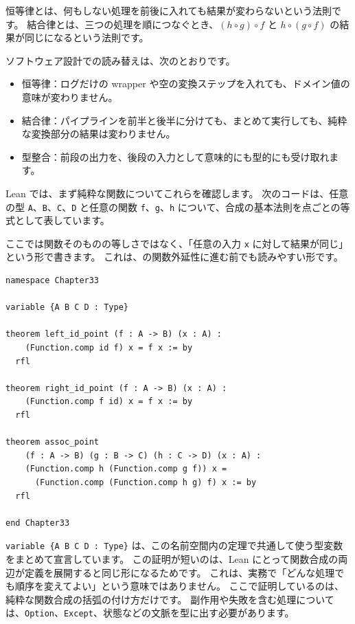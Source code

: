恒等律とは、何もしない処理を前後に入れても結果が変わらないという法則です。
結合律とは、三つの処理を順につなぐとき、\((h \circ g) \circ f\) と \(h \circ (g \circ f)\) の結果が同じになるという法則です。

ソフトウェア設計での読み替えは、次のとおりです。

\begin{itemize}
\item 恒等律：ログだけの wrapper や空の変換ステップを入れても、ドメイン値の意味が変わりません。
\item 結合律：パイプラインを前半と後半に分けても、まとめて実行しても、純粋な変換部分の結果は変わりません。
\item 型整合：前段の出力を、後段の入力として意味的にも型的にも受け取れます。
\end{itemize}

Lean では、まず純粋な関数についてこれらを確認します。
次のコードは、任意の型 \texttt{A}、\texttt{B}、\texttt{C}、\texttt{D} と任意の関数 \texttt{f}、\texttt{g}、\texttt{h} について、合成の基本法則を点ごとの等式として表しています。

ここでは関数そのものの等しさではなく、「任意の入力 \texttt{x} に対して結果が同じ」という形で書きます。
これは、の関数外延性に進む前でも読みやすい形です。

\begin{listing}[htbp]
\begin{verbatim}
namespace Chapter33

variable {A B C D : Type}

theorem left_id_point (f : A -> B) (x : A) :
    (Function.comp id f) x = f x := by
  rfl

theorem right_id_point (f : A -> B) (x : A) :
    (Function.comp f id) x = f x := by
  rfl

theorem assoc_point
    (f : A -> B) (g : B -> C) (h : C -> D) (x : A) :
    (Function.comp h (Function.comp g f)) x =
      (Function.comp (Function.comp h g) f) x := by
  rfl

end Chapter33
\end{verbatim}
\caption{\texttt{left\_id\_point}・\texttt{right\_id\_point}・\texttt{assoc\_point}}
\label{lst:ch33-composition-laws}
\end{listing}

\texttt{variable \{A B C D : Type\}} は、この名前空間内の定理で共通して使う型変数をまとめて宣言しています。
この証明が短いのは、Lean にとって関数合成の両辺が定義を展開すると同じ形になるためです。
これは、実務で「どんな処理でも順序を変えてよい」という意味ではありません。
ここで証明しているのは、純粋な関数合成の括弧の付け方だけです。
副作用や失敗を含む処理については、\texttt{Option}、\texttt{Except}、状態などの文脈を型に出す必要があります。

